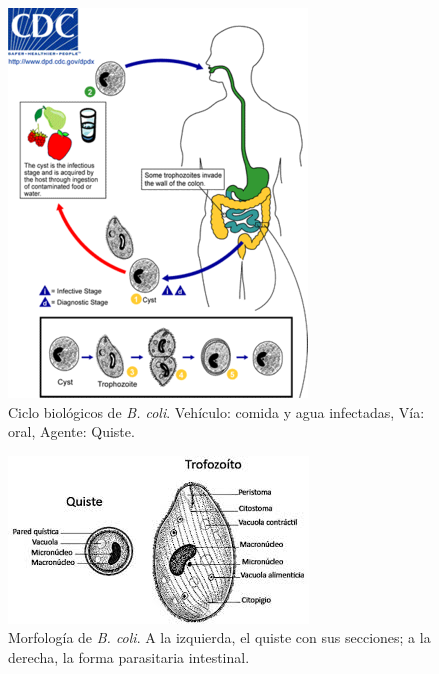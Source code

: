 \begin{multicols}{2}
	\begin{figure}[H]
		\centering
		\includegraphics[width=\columnwidth]{A.imagenes/ACV-BioSan-Parasit-BcoliCBios}
		\caption[Ciclo biológico de \textit{B. coli}]{Ciclo biológicos de \textit{B. coli}. Vehículo: comida y agua infectadas, Vía: oral, Agente: Quiste.\label{fig:PARASIT:BColiCBios}}
	\end{figure}
	\columnbreak
	\vspace*{5.4cm}
	\begin{figure}[H]
		\centering
		\includegraphics[width=\columnwidth]{A.imagenes/ACV-BioSan-Parasit-BcoliMorf}
		\caption[Morfología de \textit{B. coli}]{Morfología de \textit{B. coli}. A la izquierda, el quiste con sus secciones; a la derecha, la forma parasitaria intestinal.\label{fig:PARASIT:BColiMorf}}
	\end{figure}
\end{multicols}
